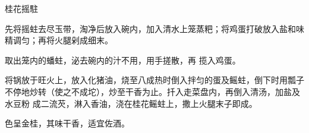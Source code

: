 \begin{recipe}{桂花摇駐}

\ingredients


\cooking

\step 先将摇蛀去尽玉带，淘净后放入碗内，加入清水上笼蒸粑；将鸡蛋打破放入盐和味
精调匀；再将火腿剁成细末。

取出笼内的蟠蛀，泌去碗内的汁不用，用手搓散，再 揽入鸡蛋。

\step 将锅放于旺火上，放入化猪油，烧至八成热时倒入拌匀的蛋及鳐蛀，倒下时用瓢子
不停地炒转（使之不成坨），炒至干香为止。扦入走菜盘内，再倒入清汤，加盐及水豆粉
成二流芡，淋入香油，浇在桂花鳐蛀上，撒上火腿末子即成。

\notes

色呈金桂，其味干香，适宜佐酒。

\end{recipe}

